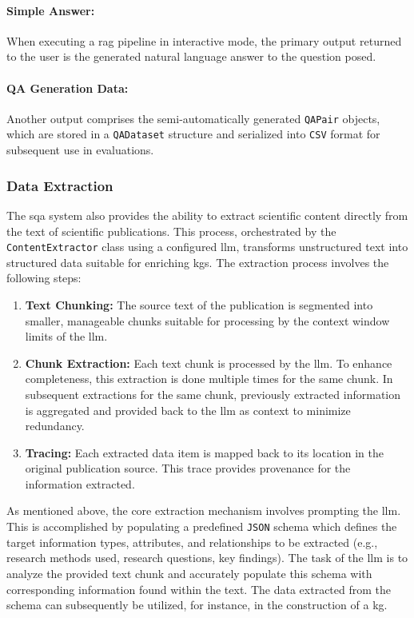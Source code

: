 \paragraph{Simple Answer:}
When executing a \gls{rag} pipeline in interactive mode, the primary output returned to the user is the generated natural language answer to the question posed.

\paragraph{QA Generation Data:} 
Another output comprises the semi-automatically generated \texttt{QAPair} objects, which are stored in a \texttt{QADataset} structure and serialized into \texttt{CSV} format for subsequent use in evaluations.

\subsubsection{Data Extraction}
The \gls{sqa} system also provides the ability to extract scientific content directly from the text of scientific publications. This process, orchestrated by the \texttt{ContentExtractor} class using a configured \gls{llm}, transforms unstructured text into structured data suitable for enriching \glspl{kg}. The extraction process involves the following steps:

\begin{enumerate}
    \item \textbf{Text Chunking:} The source text of the publication is segmented into smaller, manageable chunks suitable for processing by the context window limits of the \gls{llm}.
    \item \textbf{Chunk Extraction:} Each text chunk is processed by the \gls{llm}. To enhance completeness, this extraction is done multiple times for the same chunk. In subsequent extractions for the same chunk, previously extracted information is aggregated and provided back to the \gls{llm} as context to minimize redundancy.
    \item \textbf{Tracing:} Each extracted data item is mapped back to its location in the original publication source. This trace provides provenance for the information extracted.
\end{enumerate}

As mentioned above, the core extraction mechanism involves prompting the \gls{llm}. This is accomplished by populating a predefined \texttt{JSON} schema which defines the target information types, attributes, and relationships to be extracted (e.g., research methods used, research questions, key findings). The task of the \gls{llm} is to analyze the provided text chunk and accurately populate this schema with corresponding information found within the text. The data extracted from the schema can subsequently be utilized, for instance, in the construction of a \gls{kg}.

